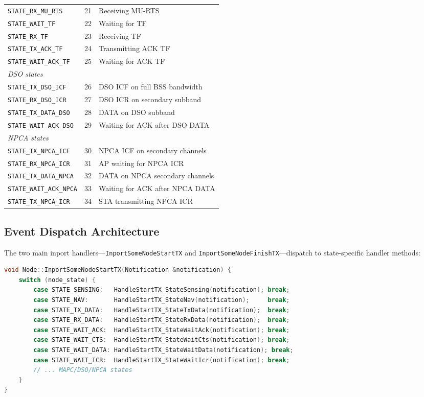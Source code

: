 \documentclass[11pt,a4paper]{article}
\begin{document}
\begin{longtable}{l c p{7.5cm}}
\texttt{STATE\_RX\_MU\_RTS} & 21 & Receiving MU-RTS \\
\texttt{STATE\_WAIT\_TF}    & 22 & Waiting for TF \\
\texttt{STATE\_RX\_TF}      & 23 & Receiving TF \\
\texttt{STATE\_TX\_ACK\_TF} & 24 & Transmitting ACK TF \\
\texttt{STATE\_WAIT\_ACK\_TF} & 25 & Waiting for ACK TF \\
\midrule
\multicolumn{3}{l}{\textit{DSO states}} \\
\texttt{STATE\_TX\_DSO\_ICF}   & 26 & DSO ICF on full BSS bandwidth \\
\texttt{STATE\_RX\_DSO\_ICR}   & 27 & DSO ICR on secondary subband \\
\texttt{STATE\_TX\_DATA\_DSO}  & 28 & DATA on DSO subband \\
\texttt{STATE\_WAIT\_ACK\_DSO} & 29 & Waiting for ACK after DSO DATA \\
\midrule
\multicolumn{3}{l}{\textit{NPCA states}} \\
\texttt{STATE\_TX\_NPCA\_ICF}    & 30 & NPCA ICF on secondary channels \\
\texttt{STATE\_RX\_NPCA\_ICR}    & 31 & AP waiting for NPCA ICR \\
\texttt{STATE\_TX\_DATA\_NPCA}   & 32 & DATA on NPCA secondary channels \\
\texttt{STATE\_WAIT\_ACK\_NPCA}  & 33 & Waiting for ACK after NPCA DATA \\
\texttt{STATE\_TX\_NPCA\_ICR}    & 34 & STA transmitting NPCA ICR \\
\end{longtable}

\subsection{Event Dispatch Architecture}

The two main inport handlers---\texttt{InportSomeNodeStartTX} and \texttt{InportSomeNode\-FinishTX}---dispatch to state-specific handler methods:

\begin{lstlisting}[language=C++,caption={StartTX dispatch (simplified)}]
void Node::InportSomeNodeStartTX(Notification &notification) {
    switch (node_state) {
        case STATE_SENSING:   HandleStartTX_StateSensing(notification); break;
        case STATE_NAV:       HandleStartTX_StateNav(notification);     break;
        case STATE_TX_DATA:   HandleStartTX_StateTxData(notification);  break;
        case STATE_RX_DATA:   HandleStartTX_StateRxData(notification);  break;
        case STATE_WAIT_ACK:  HandleStartTX_StateWaitAck(notification); break;
        case STATE_WAIT_CTS:  HandleStartTX_StateWaitCts(notification); break;
        case STATE_WAIT_DATA: HandleStartTX_StateWaitData(notification); break;
        case STATE_WAIT_ICR:  HandleStartTX_StateWaitIcr(notification); break;
        // ... MAPC/DSO/NPCA states
    }
}
\end{lstlisting}
\end{document}
